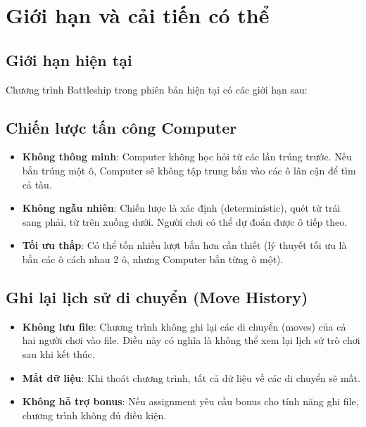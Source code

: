 
\section{Giới hạn và cải tiến có thể}

\subsection{Giới hạn hiện tại}

Chương trình Battleship trong phiên bản hiện tại có các giới hạn sau:

\subsection{Chiến lược tấn công Computer}

\begin{itemize}
    \item \textbf{Không thông minh}: Computer không học hỏi từ các lần trúng trước. Nếu bắn trúng một ô, Computer sẽ không tập trung bắn vào các ô lân cận để tìm cả tàu.
    
    \item \textbf{Không ngẫu nhiên}: Chiến lược là xác định (deterministic), quét từ trái sang phải, từ trên xuống dưới. Người chơi có thể dự đoán được ô tiếp theo.
    
    \item \textbf{Tối ưu thấp}: Có thể tốn nhiều lượt bắn hơn cần thiết (lý thuyết tối ưu là bắn các ô cách nhau 2 ô, nhưng Computer bắn từng ô một).
\end{itemize}

\subsection{Ghi lại lịch sử di chuyển (Move History)}

\begin{itemize}
    \item \textbf{Không lưu file}: Chương trình không ghi lại các di chuyển (moves) của cả hai người chơi vào file. Điều này có nghĩa là không thể xem lại lịch sử trò chơi sau khi kết thúc.
    
    \item \textbf{Mất dữ liệu}: Khi thoát chương trình, tất cả dữ liệu về các di chuyển sẽ mất.
    
    \item \textbf{Không hỗ trợ bonus}: Nếu assignment yêu cầu bonus cho tính năng ghi file, chương trình không đủ điều kiện.
\end{itemize}

